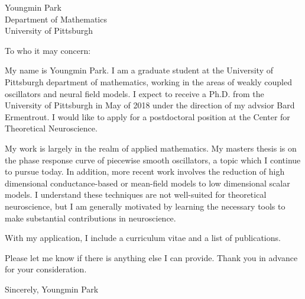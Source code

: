 \documentclass[a4paper,11pt]{letter}
\begin{document}
\begin{letter}{Youngmin Park \\ Department of Mathematics\\ University of Pittsburgh}

\opening{To who it may concern:}

My name is Youngmin Park. I am a graduate student at the University of Pittsburgh department of mathematics, working in the areas of weakly coupled oscillators and neural field models. I expect to receive a Ph.D. from the University of Pittsburgh in May of 2018 under the direction of my advsior Bard Ermentrout. I would like to apply for a postdoctoral position at the Center for Theoretical Neuroscience.
 
My work is largely in the realm of applied mathematics. My masters thesis is on the phase response curve of piecewise smooth oscillators, a topic which I continue to pursue today. In addition, more recent work involves the reduction of high dimensional conductance-based or mean-field models to low dimensional scalar models. I understand these techniques are not well-suited for theoretical neuroscience, but I am generally motivated by learning the necessary tools to make substantial contributions in neuroscience.

With my application, I include a curriculum vitae and a list of publications.

Please let me know if there is anything else I can provide. Thank you in advance for your consideration.

Sincerely,
Youngmin Park
 
 
 
\end{letter}
\end{document}
